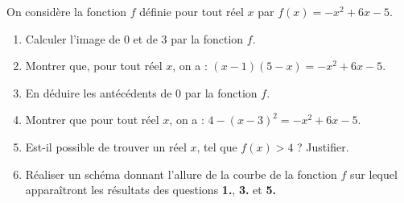 On considère la fonction $f$ définie pour tout réel $x$ par $f(x) = -x^2 + 6x - 5$.

\begin{enumerate}
\item Calculer l'image de 0 et de 3 par la fonction $f$.

\item Montrer que, pour tout réel $x$, on a : $(x - 1)(5 - x) = -x^2 + 6x - 5$.

\item En déduire les antécédents de 0 par la fonction $f$.

\item Montrer que pour tout réel $x$, on a : $4 - (x - 3)^2 = -x^2 + 6x - 5$.

\item Est-il possible de trouver un réel $x$, tel que $f(x) > 4$ ? Justifier.

\item Réaliser un schéma donnant l'allure de la courbe de la fonction $f$ sur lequel apparaîtront les résultats des questions \textbf{1.}, \textbf{3.} et \textbf{5.}
\end{enumerate}
